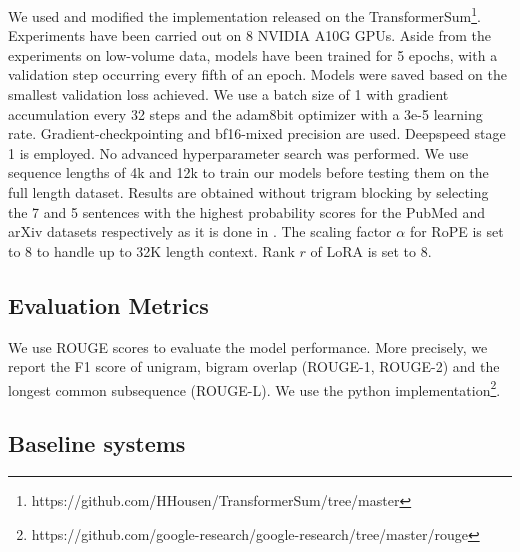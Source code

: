 We used and modified the implementation released on the TransformerSum\footnote{https://github.com/HHousen/TransformerSum/tree/master}. Experiments have been carried out on 8 NVIDIA A10G GPUs. Aside from the experiments on low-volume data, models have been trained for 5 epochs, with a validation step occurring every fifth of an epoch. Models were saved based on the smallest validation loss achieved. We use a batch size of 1 with gradient accumulation every 32 steps and the adam8bit optimizer with a 3e-5 learning rate. Gradient-checkpointing and bf16-mixed precision are used. Deepspeed stage 1 is employed. No advanced hyperparameter search was performed. We use sequence lengths of 4k and 12k to train our models before testing them on the full length dataset. Results are obtained without trigram blocking by selecting the 7 and 5 sentences with the highest probability scores for the PubMed and arXiv datasets respectively as it is done in \cite{cho-etal-2022-toward}. The scaling factor $\alpha$ for RoPE is set to 8 to handle up to 32K length context. Rank $r$ of LoRA is set to 8. 

\subsection{Evaluation Metrics}

We use ROUGE scores to evaluate the model performance\cite{lin-2004-rouge}. More precisely, we report the F1 score of unigram, bigram overlap (ROUGE-1, ROUGE-2) and the longest common subsequence (ROUGE-L). We use the python implementation\footnote{https://github.com/google-research/google-research/tree/master/rouge}.

\subsection{Baseline systems}


